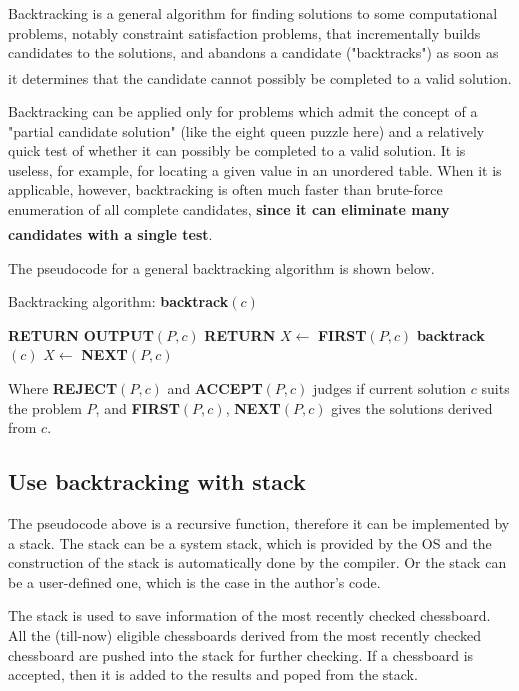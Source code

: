 \documentclass[cn,black,12pt,normal]{elegantnote}
\newcommand{\uct}[1]{\textsuperscript{\textsuperscript{\cite{#1}}}}
\begin{document}
Backtracking is a general algorithm for finding solutions to some computational problems, notably constraint satisfaction problems, that incrementally builds candidates to the solutions, and abandons a candidate ("backtracks") as soon as it determines that the candidate cannot possibly be completed to a valid solution.\uct{gurari1999cis}

Backtracking can be applied only for problems which admit the concept of a "partial candidate solution" (like the eight queen puzzle here) and a relatively quick test of whether it can possibly be completed to a valid solution. It is useless, for example, for locating a given value in an unordered table. When it is applicable, however, backtracking is often much faster than brute-force enumeration of all complete candidates, \textbf{since it can eliminate many candidates with a single test}.\uct{wiki:Backtracking}

The pseudocode for a general backtracking algorithm is shown below.

\begin{algorithm}[H]
    \caption{Backtracking algorithm: \textbf{backtrack}$(c)$}
    \label{alg1}
    \begin{algorithmic}
        \STATE \textbf{RETURN}
        \ENDIF
        \STATE \textbf{OUTPUT}$(P,c)$
        \STATE \textbf{RETURN}
        \ENDIF
        \STATE $X \gets$ \textbf{FIRST}$(P,c)$
        \STATE \textbf{backtrack}$(c)$
        \STATE $X \gets$ \textbf{NEXT}$(P,c)$
        \ENDWHILE
    \end{algorithmic}
\end{algorithm}

Where \textbf{REJECT}$(P,c)$ and \textbf{ACCEPT}$(P,c)$ judges if current solution $c$ suits the problem $P$, and \textbf{FIRST}$(P,c)$, \textbf{NEXT}$(P,c)$ gives the solutions derived from $c$.

\subsection{Use backtracking with stack}
The pseudocode above is a recursive function, therefore it can be implemented by a stack. The stack can be a system stack, which is provided by the OS and the construction of the stack is automatically done by the compiler. Or the stack can be a user-defined one, which is the case in the author's code.

The stack is used to save information of the most recently checked chessboard. All the (till-now) eligible chessboards derived from the most recently checked chessboard are pushed into the stack for further checking. If a chessboard is accepted, then it is added to the results and poped from the stack.
\end{document}
